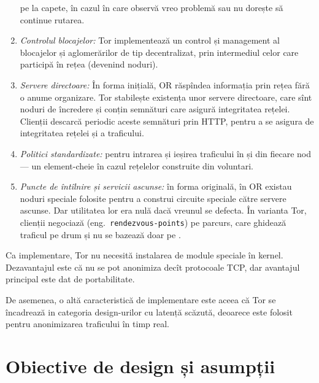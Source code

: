\begin{enumerate}[(1)]
    pe la capete, în cazul în care observă vreo problemă sau nu dorește
    să continue rutarea.
  \item \textit{Controlul blocajelor:} Tor implementează un control și
    management al blocajelor și a\-glo\-me\-ră\-ri\-lor de tip decentralizat,
    prin intermediul celor care participă în rețea (devenind noduri).
  \item \textit{Servere directoare:} În forma inițială, OR răspîndea
    informația prin rețea fără o anume organizare. Tor stabilește
    existența unor servere directoare, care sînt noduri de încredere
    și conțin semnături care asigură integritatea rețelei. Clienții
    descarcă periodic aceste semnături prin HTTP, pentru a se asigura
    de integritatea rețelei și a traficului.
  \item \textit{Politici standardizate:} pentru intrarea și ieșirea
    traficului în și din fiecare nod --- un element-cheie în cazul
    rețelelor construite din voluntari.
  \item \textit{Puncte de întîlnire și servicii ascunse:} în forma
    originală, în OR existau noduri speciale folosite pentru a construi
    circuite speciale către servere ascunse. Dar utilitatea lor era nulă dacă
    vreunul se defecta. În varianta Tor, clienții negociază  (eng.\ \texttt{rendezvous-points}) pe parcurs, care ghidează
    traficul pe drum și nu se bazează doar pe .
\end{enumerate}

Ca implementare, Tor nu necesită instalarea de module speciale în kernel.
Dezavantajul este că nu se pot anonimiza decît protocoale TCP, dar avantajul
principal este dat de portabilitate.

De asemenea, o altă caracteristică de implementare este aceea că Tor se 
încadrează in categoria design-urilor cu latență scăzută, deoarece este
folosit pentru anonimizarea traficului în timp real.



\section{Obiective de design și asumpții}

